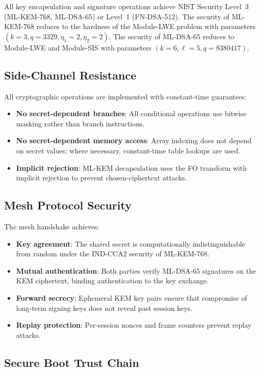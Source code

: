 \documentclass[conference,10pt]{IEEEtran}
\begin{document}
All key encapsulation and signature operations achieve NIST Security Level~3 (ML-KEM-768, ML-DSA-65) or Level~1 (FN-DSA-512). The security of ML-KEM-768 reduces to the hardness of the Module-LWE problem with parameters $(k=3, q=3329, \eta_1=2, \eta_2=2)$. The security of ML-DSA-65 reduces to Module-LWE and Module-SIS with parameters $(k=6, \ell=5, q=8380417)$.

\subsection{Side-Channel Resistance}

All cryptographic operations are implemented with constant-time guarantees:
\begin{itemize}[leftmargin=*]
  \item \textbf{No secret-dependent branches}: All conditional operations use bitwise masking rather than branch instructions.
  \item \textbf{No secret-dependent memory access}: Array indexing does not depend on secret values; where necessary, constant-time table lookups are used.
  \item \textbf{Implicit rejection}: ML-KEM decapsulation uses the FO transform with implicit rejection to prevent chosen-ciphertext attacks.
\end{itemize}

\subsection{Mesh Protocol Security}

The mesh handshake achieves:
\begin{itemize}[leftmargin=*]
  \item \textbf{Key agreement}: The shared secret is computationally indistinguishable from random under the IND-CCA2 security of ML-KEM-768.
  \item \textbf{Mutual authentication}: Both parties verify ML-DSA-65 signatures on the KEM ciphertext, binding authentication to the key exchange.
  \item \textbf{Forward secrecy}: Ephemeral KEM key pairs ensure that compromise of long-term signing keys does not reveal past session keys.
  \item \textbf{Replay protection}: Per-session nonces and frame counters prevent replay attacks.
\end{itemize}

\subsection{Secure Boot Trust Chain}
\end{document}
